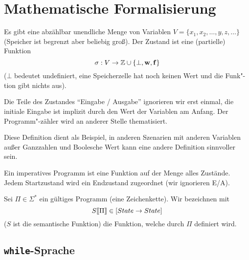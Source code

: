 \section{Mathematische Formalisierung}

\begin{definition}[Zustand]
    Es gibt eine abzählbar unendliche Menge von Variablen $V = \{ x_1, x_2, \dots, y, z, \dots \}$ (Speicher ist begrenzt aber beliebig groß). Der Zustand ist eine (partielle) Funktion \[
    \sigma: V \to \mathbb{Z} \cup \{ \bot, \operatorname{\mathbf{w}}, \operatorname{\mathbf{f}} \}
    \]
    ($\bot$ bedeutet undefiniert, \dh{} eine Speicherzelle hat noch keinen Wert und die Funk"-tion gibt nichts aus).

    Die Teile des Zustandes ``Eingabe / Ausgabe'' ignorieren wir erst einmal, \dh{} die initiale Eingabe ist implizit durch den Wert der Variablen am Anfang. Der Programm"-zähler wird an anderer Stelle thematisiert.
\end{definition}

\begin{remark}
    Diese Definition dient als Beispiel, \dh{} in anderen Szenarien mit anderen Variablen außer Ganzzahlen und Boolesche Wert kann eine andere Definition sinnvoller sein.
\end{remark}

\begin{definition}
    Ein imperatives Programm ist eine Funktion auf der Menge alles Zustände. Jedem Startzustand wird ein Endzustand zugeordnet (wir ignorieren E/A).
\end{definition}

\begin{notation}
    Sei $\Pi \in \Sigma^*$ ein gültiges Programm (eine Zeichenkette). Wir bezeichnen mit
    \[
    S\mathrm{[}\kern-.14em\mathrm{[}\Pi\mathrm{]}\kern-.14em\mathrm{]} \in [State \to State]
    \]
    ($S$ ist die semantische Funktion) die Funktion, welche durch $\Pi$ definiert wird.
\end{notation}



\subsection{\texttt{while}-Sprache}\label{section:while}

